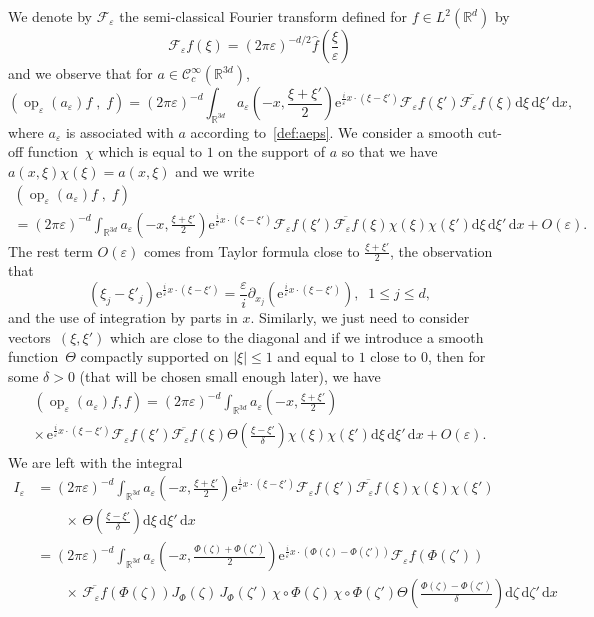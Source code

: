 \documentclass[10pt]{amsart}
\theoremstyle{definition}
\DeclareMathOperator{\op}{op}
\newcommand*\R{{\mathbb R}}
\newcommand*\eps{\varepsilon}
\numberwithin{equation}{section}
\newcommand{\ee}{{\mathrm e}}
\newcommand*{\dd}{\mathrm{d}}
\newcommand*{\dx}{\dd x}
\newcommand*{\dxi}{\dd \xi}
\newcommand*{\dzeta}{\dd \zeta}
\begin{document}
We denote by ${\mathcal F}_\eps$ the semi-classical Fourier transform defined for $f\in L^2(\R^d)$ by
\[
{\mathcal F}_\eps f(\xi)=(2\pi\eps)^{-d/2} \widehat f\left(\frac{\xi}{\eps}\right)
\]
and we observe that for $a\in{\mathcal C}_c^\infty(\R^{3d})$,
\[
\left(\op_\eps(a_\eps)f\;,\;f\right)=(2\pi\eps)^{-d} \int_{\R^{3d}} a_\eps\left(-x,\frac{\xi+\xi'}{2}\right) {\ee}^{\frac{i}{\eps} x\cdot (\xi-\xi')}{\mathcal F}_\eps f(\xi')\overline{{\mathcal F}_\eps f}(\xi) \dxi\,\dxi'\,\dx,
\]
where $a_\eps$ is associated with $a$ according to~\eqref{def:aeps}. We consider a smooth cut-off function~$\chi$ which is equal to $1$ on the support of $a$ so that we have $a(x,\xi) \chi(\xi)=a(x,\xi)$ and we write
\begin{multline*}
\left(\op_\eps(a_\eps)f\;,\;f\right)\\
 =
(2\pi\eps)^{-d} \int_{\R^{3d}} a_\eps\left(-x,\frac{\xi+\xi'}{2}\right) {\ee}^{\frac{i}{\eps} x\cdot (\xi-\xi')}{\mathcal F}_\eps f(\xi')\overline{{\mathcal F}_\eps f}(\xi) \chi(\xi)\chi(\xi')\dxi\,\dxi'\,\dx + O(\eps).
\end{multline*}
The rest term $O(\eps)$ comes from Taylor formula close to $\frac{\xi+\xi'}{2}$, the observation that
\[
(\xi_j-\xi'_j) {\ee}^{\frac{i}{\eps} x\cdot (\xi-\xi')}=\frac{ \eps}{i} \partial_{x_j} \left({\ee}^{\frac{i}{\eps} x\cdot (\xi-\xi')}\right),\;\;1\leq j\leq d,
\]
and the use of integration by parts {in $x$}. Similarly, we just need to consider vectors~$(\xi,\xi')$ which are close to the diagonal and if we introduce a smooth function~$\Theta$ compactly supported on $|\xi|\leq 1$ and equal to $1$ close to $0$, then for some $\delta>0$ (that will be chosen small enough later), we have
\begin{multline*}
 \left(\op_\eps(a_\eps)f,f\right)=(2\pi\eps)^{-d} \int_{\R^{3d}} a_\eps\left(-x,\frac{\xi+\xi'}{2}\right) \\
\times\, {\ee}^{\frac{i}{\eps} x\cdot (\xi-\xi')}{\mathcal F}_\eps f(\xi')\overline{{\mathcal F}_\eps f}(\xi) \Theta\left(\frac{\xi-\xi'}{\delta}\right)\chi(\xi)\chi(\xi')\dxi\,\dxi'\,\dx + O(\eps).
\end{multline*}
We are left with the integral
\begin{align*}
I_\eps &= (2\pi\eps)^{-d} \int_{\R^{3d}} a_\eps\left(-x,\frac{\xi+\xi'}{2}\right) {\ee}^{\frac{i}{\eps} x\cdot (\xi-\xi')}{\mathcal F}_\eps f(\xi')\overline{{\mathcal F}_\eps f}(\xi) \chi(\xi)\chi(\xi')\\
& \qquad \times\, \Theta\left(\frac{\xi-\xi'}{\delta}\right)\dxi\,\dxi'\,\dx\\
&= (2\pi\eps)^{-d} \int_{\R^{3d}} a_\eps\left(-x,\frac{\Phi(\zeta)+\Phi(\zeta')}{2}\right) {\ee}^{\frac{i}{\eps} x\cdot (\Phi(\zeta)-\Phi(\zeta'))}{\mathcal F}_\eps f(\Phi(\zeta'))\\
& \qquad \times \,\overline{{\mathcal F}_\eps f}(\Phi(\zeta)) J_\Phi(\zeta)\, J_\Phi(\zeta')\, \chi\circ \Phi(\zeta)\, \chi\circ\Phi(\zeta') \Theta\left(\frac{\Phi(\zeta)-\Phi(\zeta')}{\delta}\right)\dzeta\,\dzeta'\,\dx
\end{align*}
\end{document}
